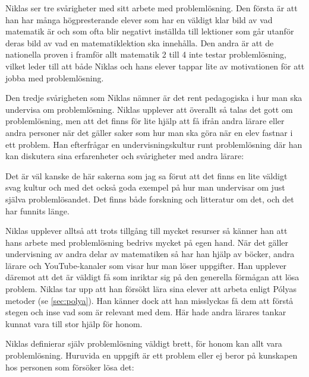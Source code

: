 \textcolor{turkos}{
Niklas ser tre svårigheter med sitt arbete med problemlösning. Den första är att han har många högpresterande elever som har en väldigt klar bild av vad matematik är och som ofta blir negativt inställda till lektioner som går utanför deras bild av vad en matematiklektion ska innehålla. Den andra är att de nationella proven i framför allt matematik 2 till 4 inte testar problemlösning, vilket leder till att både Niklas och hans elever tappar lite av motivationen för att jobba med problemlösning.}

\textcolor{turkos}{Den tredje svårigheten som Niklas nämner är det rent pedagogiska i hur man ska undervisa om problemlösning. Niklas upplever att överallt så talas det gott om problemlösning, men att det finns för lite hjälp att få ifrån andra lärare eller andra personer när det gäller saker som hur man ska göra när en elev fastnar i ett problem. Han efterfrågar en undervisningskultur runt problemlösning där han kan diskutera sina erfarenheter och svårigheter med andra lärare: 
}

\begin{displayquote}
\textcolor{turkos}{Det är väl kanske de här sakerna som jag sa förut att det finns en lite väldigt svag kultur och med det också goda exempel på hur man undervisar om just själva problemlösandet. Det finns både forskning och litteratur om det, och det har funnits länge.}
\end{displayquote}

\noindent\textcolor{turkos}{
Niklas upplever alltså att trots tillgång till mycket resurser så känner han att hans arbete med problemlösning bedrivs mycket på egen hand. När det gäller undervisning av andra delar av matematiken så har han hjälp av böcker, andra lärare och YouTube-kanaler som visar hur man löser uppgifter. Han upplever däremot att det är väldigt få som inriktar sig på den generella förmågan att lösa problem. Niklas tar upp att han försökt lära sina elever att arbeta enligt Pólyas metoder (se \ref{sec:polya}). Han känner dock att han misslyckas få dem att förstå stegen och inse vad som är relevant med dem. Här hade andra lärares tankar kunnat vara till stor hjälp för honom.
}

\textcolor{turkos}{
Niklas definierar själv problemlösning väldigt brett, för honom kan allt vara problemlösning. Huruvida en uppgift är ett problem eller ej beror på kunskapen hos personen som försöker lösa det:
}

